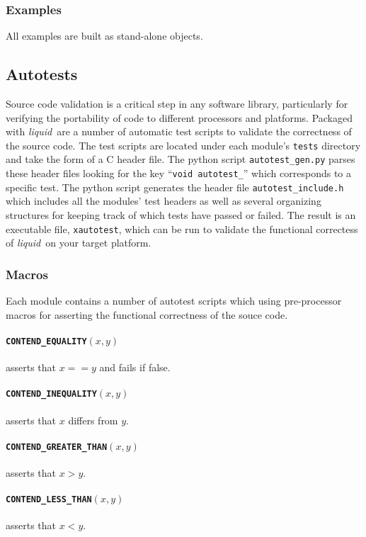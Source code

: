 \documentclass[11pt,twoside]{report}
\newcommand{\liquid}{{\it liquid}}
\begin{document}
\subsubsection{Examples}
All examples are built as stand-alone objects.

\subsection{Autotests}
\label{ch:installation:targets:autotests}
Source code validation is a critical step in any software library,
particularly for verifying the portability of code to different processors and
platforms.
Packaged with \liquid\ are a number of automatic test scripts to validate the
correctness of the source code.
The test scripts are located under each module's {\tt tests} directory and
take the form of a C header file.
The python script {\tt autotest\_gen.py} parses these header files looking for
the key ``{\tt void autotest\_}'' which corresponds to a specific test.
The python script generates the header file {\tt autotest\_include.h} which
includes all the modules' test headers as well as several organizing
structures for keeping track of which tests have passed or failed.
The result is an executable file, {\tt xautotest}, which can be run to
validate the functional correctess of \liquid\ on your target platform.

\subsubsection{Macros}
Each module contains a number of autotest scripts which using pre-processor
macros for asserting the functional correctness of the souce code.

\paragraph{{\tt CONTEND\_EQUALITY}$(x,y)$} asserts that $x==y$ and fails if
false.
\paragraph{{\tt CONTEND\_INEQUALITY}$(x,y)$} asserts that $x$ differs from
$y$.
\paragraph{{\tt CONTEND\_GREATER\_THAN}$(x,y)$} asserts that $x>y$.
\paragraph{{\tt CONTEND\_LESS\_THAN}$(x,y)$} asserts that $x<y$.
\end{document}

